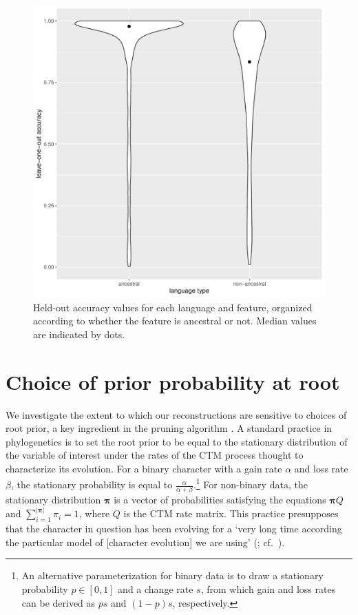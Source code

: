 \documentclass[12pt]{article}
\begin{document}
\begin{appendices}
\begin{figure}
    \centering
    \includegraphics[width=.6\linewidth]{Figures-IE-grammar/LOO_accuracy.pdf}
    \caption{Held-out accuracy values for each language and feature, organized according to whether the feature is ancestral or not. Median values are indicated by dots.}
    \label{LOO}
\end{figure}

\section{Choice of prior probability at root}
\label{root.prior}

We investigate the extent to which our reconstructions are sensitive to choices of {\sc root prior}, a key ingredient in the {\sc pruning algorithm} \citep{Felsenstein1981,Felsenstein2004}. 
A standard practice in phylogenetics is to set the root prior to be equal to the stationary distribution of the variable of interest under the rates of the CTM process thought to characterize its evolution. For a binary character with a gain rate $\alpha$ and loss rate $\beta$, the stationary probability is equal to $\frac{\alpha}{\alpha + \beta}$.\footnote{An alternative parameterization for binary data is to draw a stationary probability $p \in [0,1]$ and a change rate $s$, from which gain and loss rates can be derived as $ps$ and $(1-p)s$, respectively.} 
For non-binary data, the stationary distribution $\boldsymbol{\pi}$ is a vector of probabilities satisfying the equations $\boldsymbol{\pi}Q$ and $\sum_{i=1}^{|\boldsymbol{\pi}|} \pi_i = 1$, where $Q$ is the CTM rate matrix. 
This practice presupposes that the character in question has been evolving for a `very long time according the particular model of [character evolution] we are using' (\citealt[255]{Felsenstein2004}; cf.\ \citealt{Cathcart2018modeling}). 


\end{appendices}
\end{document}

